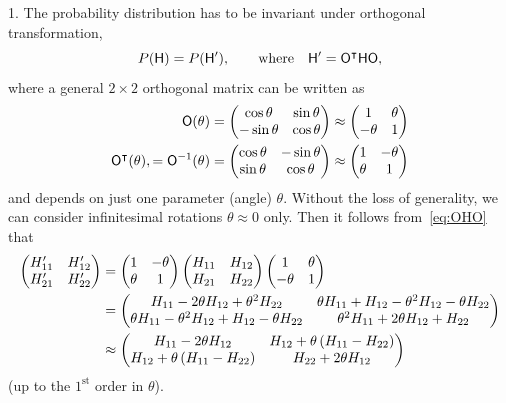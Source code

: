 \documentclass[a4paper,11pt,twoside]{article}
\begin{document}
            1. The probability distribution has to be invariant under orthogonal transformation,
            \begin{equation}\label{eq:OHO}
                P(\mathsf{H})=P(\mathsf{H}'),\qquad\text{where}\quad\mathsf{H}'={\mathsf{O}}^{\intercal}\mathsf{H}\mathsf{O},
            \end{equation}
            where a general $2\times2$ orthogonal matrix can be written as
            \begin{align}\label{eq:O}
                \mathsf{O}(\theta)
                    &=\begin{pmatrix}\cos\theta & \sin\theta \\ -\sin\theta & \cos\theta\end{pmatrix}
                    \approx\begin{pmatrix}1 & \theta \\ -\theta & 1\end{pmatrix}\\
                    {\mathsf{O}}^{\intercal}(\theta),
                    =\mathsf{O}^{-1}(\theta)
                    &=\begin{pmatrix}\cos\theta & -\sin\theta \\ \sin\theta & \cos\theta\end{pmatrix}
                    \approx\begin{pmatrix}1 & -\theta \\ \theta & 1\end{pmatrix}
            \end{align}
            and depends on just one parameter (angle) $\theta$.
            Without the loss of generality, we can consider infinitesimal rotations $\theta\approx0$ only.
            Then it follows from~\eqref{eq:OHO} that
            \begin{align}
                \begin{pmatrix}H'_{11} & H'_{12} \\ H'_{21} & H'_{22}\end{pmatrix}
                    &=\begin{pmatrix}1 & -\theta \\ \theta & 1\end{pmatrix}
                        \begin{pmatrix}H_{11} & H_{12} \\ H_{21} & H_{22}\end{pmatrix}
                        \begin{pmatrix}1 & \theta \\ -\theta & 1\end{pmatrix}\nonumber\\
                    &=\begin{pmatrix}H_{11}-2\theta H_{12}+\theta^{2}H_{22} & 
                        \theta H_{11}+H_{12}-\theta^{2}H_{12}-\theta H_{22} \\
                        \theta H_{11}-\theta^{2}H_{12}+H_{12}-\theta H_{22} & 
                        \theta^{2}H_{11}+2\theta H_{12}+H_{22}\end{pmatrix}\nonumber\\
                    \label{eq:HpH}
                    &\approx\begin{pmatrix}H_{11}-2\theta H_{12} & H_{12}+\theta\left(H_{11}-H_{22}\right) \\
                        H_{12}+\theta\left(H_{11}-H_{22}\right) & H_{22}+2\theta H_{12}\end{pmatrix}
            \end{align}
            (up to the $1^{\text{st}}$ order in $\theta$).
\end{document}
